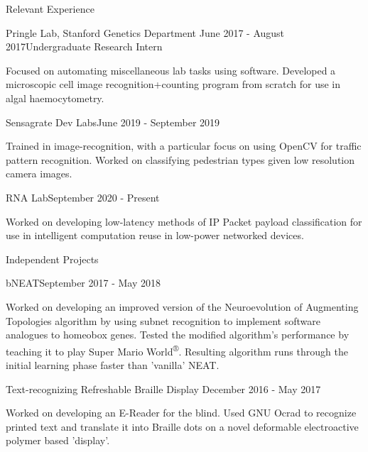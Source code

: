 \documentclass{resume} %
\begin{document}
\begin{resumeSection}{Relevant Experience}

\begin{resumeSubsection}{Pringle Lab, Stanford Genetics Department}
	{June 2017 - August 2017}{Undergraduate Research Intern}{}
\item Focused on automating miscellaneous lab tasks using software. Developed a 
	microscopic cell image recognition+counting program from scratch for
	use in algal haemocytometry. 
\end{resumeSubsection}
\begin{resumeSubsection}{Sensagrate Dev Labs}{June 2019 - September 2019}{}{}
\item Trained in image-recognition, with a particular focus on using OpenCV for
	traffic pattern recognition. Worked on classifying pedestrian types
	given low resolution camera images. 
\end{resumeSubsection}
\begin{resumeSubsection}{RNA Lab}{September 2020 - Present}{}{}
\item Worked on developing low-latency methods of IP Packet payload
	classification for use in intelligent computation reuse in low-power
	networked devices. 
\end{resumeSubsection}

\end{resumeSection}


\begin{resumeSection}{Independent Projects} \itemsep -2pt

\begin{resumeSubsection}{bNEAT}{September 2017 - May 2018}{}{}
\item Worked on developing an improved version of the Neuroevolution of
	Augmenting Topologies algorithm by using subnet recognition to
	implement software analogues to homeobox genes. Tested the modified
	algorithm's performance by teaching it to play Super Mario
	World\textsuperscript{®}. Resulting algorithm runs through the initial
	learning phase faster than 'vanilla' NEAT.
\end{resumeSubsection}
\begin{resumeSubsection}{Text-recognizing Refreshable Braille Display}
	{December 2016 - May 2017}{}{}
\item Worked on developing an E-Reader for the blind. Used GNU Ocrad to
	recognize printed text and translate it into Braille dots on a
	novel deformable electroactive polymer based 'display'. 
\end{resumeSubsection}

\end{resumeSection}
\end{document}
